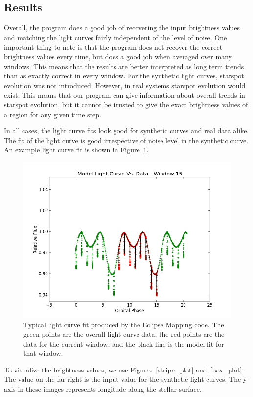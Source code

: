 

\subsection{Results \label{results}}
Overall, the program does a good job of recovering the input brightness values and matching the light curves fairly independent of the level of noise. One important thing to note is that the program does not recover the correct brightness values every time, but does a good job when averaged over many windows. This means that the results are better interpreted as long term trends than as exactly correct in every window. For the synthetic light curves, starspot evolution was not introduced. However, in real systems starspot evolution would exist. This means that our program can give information about overall trends in starspot evolution, but it cannot be trusted to give the exact brightness values of a region for any given time step. 

In all cases, the light curve fits look good for synthetic curves and real data alike. The fit of the light curve is good irrespective of noise level in the synthetic curve. An example light curve fit is shown in Figure~\ref{LC_Fit}.
\begin{figure}[h]
	\centering
	\includegraphics[width=.5\textwidth]{images/2b_2s/14_noise/model_fit_w15.png}
	\caption{Typical light curve fit produced by the Eclipse Mapping code. The green points are the overall light curve data, the red points are the data for the current window, and the black line is the model fit for that window.}
	\label{LC_Fit}
\end{figure}

To visualize the brightness values, we use Figures~\ref{stripe_plot} and~\ref{box_plot}. The value on the far right is the input value for the synthetic light curves. The y-axis in these images represents longitude along the stellar surface.

